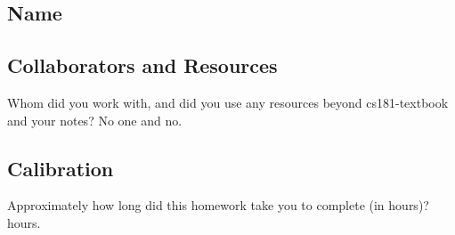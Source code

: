 \documentclass[submit]{harvardml}
\begin{document}
\newpage
\subsection*{Name}

\subsection*{Collaborators and Resources}
Whom did you work with, and did you use any resources beyond cs181-textbook and your notes? \newline No one and no.

\subsection*{Calibration}
Approximately how long did this homework take you to complete (in hours)?  hours.
\end{document}
